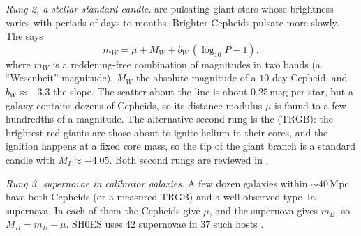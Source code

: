 \emph{Rung 2, a stellar standard candle.}  are pulsating giant stars whose brightness varies with periods of days to months. Brighter Cepheids pulsate more slowly. The   says
\begin{equation}
  m_{W}=\mu+M_W+b_W\,(\log_{10}P-1),
  \label{T2b:eq:leavitt}
\end{equation}
where $m_W$ is a reddening-free combination of magnitudes in two bands (a ``Wesenheit'' magnitude), $M_W$ the absolute magnitude of a $10$-day Cepheid, and $b_W\approx-3.3$ the slope. The scatter about the line is about $0.25$\,mag per star, but a galaxy contains dozens of Cepheids, so its distance modulus $\mu$ is found to a few hundredths of a magnitude. The alternative second rung is the  (TRGB): the brightest red giants are those about to ignite helium in their cores, and the ignition happens at a fixed core mass, so the tip of the giant branch is a standard candle with $M_I\approx-4.05$. Both second rungs are reviewed in \cite[Sec.~IV.A]{Abdalla2022}.

\emph{Rung 3, supernovae in calibrator galaxies.} A few dozen galaxies within $\sim40$\,Mpc have both Cepheids (or a measured TRGB) and a well-observed type~Ia supernova. In each of them the Cepheids give $\mu$, and the supernova gives $m_B$, so $M_B=m_B-\mu$. SH0ES uses $42$ supernovae in $37$ such hosts \cite{Riess2022SH0ES}.

